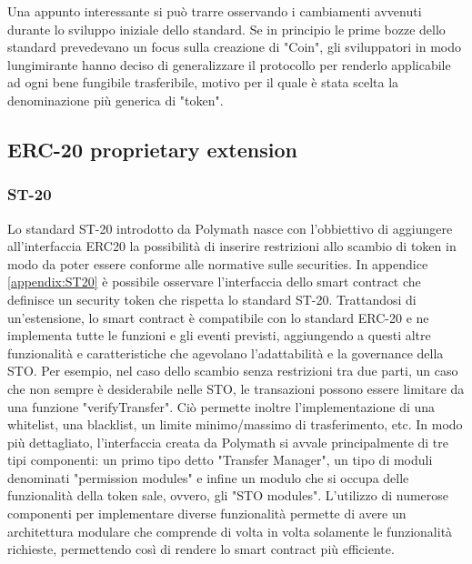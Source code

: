 Una appunto interessante si può trarre osservando i cambiamenti avvenuti durante lo sviluppo iniziale dello standard. Se in principio le prime bozze dello standard prevedevano un focus sulla creazione di "Coin", gli sviluppatori in modo lungimirante hanno deciso di generalizzare il protocollo per renderlo applicabile ad ogni bene fungibile trasferibile, motivo per il quale è stata scelta la denominazione più generica di "token"\cite{https://www.reddit.com/r/ethereum/comments/3n8fkn/lets_talk_about_the_coin_standard/}.

\subsection{ERC-20 proprietary extension}
\subsubsection{ST-20}
Lo standard ST-20 introdotto da Polymath nasce con l'obbiettivo di aggiungere all'interfaccia ERC20 la possibilità di inserire restrizioni allo scambio di token in modo da poter essere conforme alle normative sulle securities. 
In appendice \ref{appendix:ST20} è possibile osservare l'interfaccia dello smart contract che definisce un security token che rispetta lo standard ST-20. Trattandosi di un'estensione, lo smart contract è compatibile con lo standard ERC-20 e ne implementa tutte le funzioni e gli eventi previsti, aggiungendo a questi altre funzionalità e caratteristiche che agevolano l'adattabilità e la governance della STO. Per esempio, nel caso dello scambio senza restrizioni tra due parti, un caso che non sempre è desiderabile nelle STO, le transazioni possono essere limitare da una funzione "verifyTransfer". Ciò permette inoltre l'implementazione di una whitelist, una blacklist, un limite minimo/massimo di trasferimento, etc. 
In modo più dettagliato, l'interfaccia creata da Polymath si avvale principalmente di tre tipi componenti: un primo tipo detto "Transfer Manager", un tipo di moduli denominati "permission modules" e infine un modulo che si occupa delle funzionalità della token sale, ovvero, gli "STO modules". 
L'utilizzo di numerose componenti per implementare diverse funzionalità permette di avere un architettura modulare che comprende di volta in volta solamente le funzionalità richieste, permettendo così di rendere lo smart contract più efficiente.

